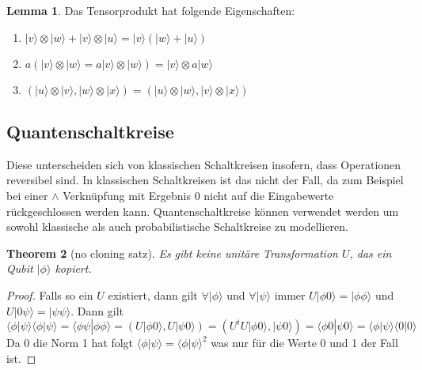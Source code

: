 \documentclass[a4paper, 12pt]{article}
\theoremstyle{plain}
\newtheorem{theorem}{Theorem}[section] %
\theoremstyle{definition}
\theoremstyle{lemma}
\newtheorem{lemma}[theorem]{Lemma}
\theoremstyle{remark}
\theoremstyle{example}
\begin{document}
	\begin{lemma}
		Das Tensorprodukt hat folgende Eigenschaften:
		\begin{enumerate}
			\item $|v\rangle \otimes |w\rangle + |v\rangle \otimes |u\rangle = |v\rangle (|w\rangle + |u\rangle)$
			\item $a(|v\rangle \otimes |w\rangle = a|v\rangle \otimes |w\rangle) = |v\rangle \otimes a|w\rangle$
			\item $(|u\rangle \otimes |v\rangle , |w\rangle \otimes |x\rangle) = (|u\rangle\otimes|w\rangle , |v\rangle\otimes|x\rangle)$
		\end{enumerate}
	\end{lemma}

	\subsection{Quantenschaltkreise}
	Diese unterscheiden sich von klassischen Schaltkreisen insofern, dass Operationen reversibel sind. In klassischen Schaltkreisen ist das nicht der Fall, da zum Beispiel bei einer $\land$ Verknüpfung mit Ergebnis 0 nicht auf die Eingabewerte rückgeschlossen werden kann. Quantenschaltkreise können verwendet werden um sowohl klassische als auch probabilistische Schaltkreise zu modellieren.
	\begin{theorem} [no cloning satz]
		Es gibt keine unitäre Transformation $U$, das ein Qubit $|\phi\rangle$ kopiert.
	\end{theorem}
	\begin{proof}
		Falls so ein $U$ existiert, dann gilt $\forall |\phi\rangle$ und $\forall |\psi\rangle$ immer $U|\phi 0 \rangle = |\phi\phi\rangle$ und $U|0\psi\rangle = |\psi\psi\rangle$. Dann gilt \[\langle\phi|\psi\rangle\langle\phi|\psi\rangle = \langle\phi\psi|\phi\phi\rangle = (U|\phi0\rangle, U|\psi0\rangle) = (U^tU|\phi0\rangle, |\psi0\rangle) = \langle\phi0|\psi0\rangle = \langle\phi|\psi\rangle\langle0|0\rangle\] Da 0 die Norm 1 hat folgt $\langle\phi|\psi\rangle = \langle\phi|\psi\rangle^2$ was nur für die Werte 0 und 1 der Fall ist.
	\end{proof}
\end{document}
